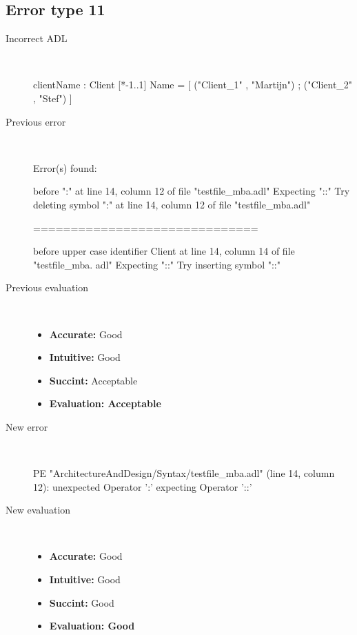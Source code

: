 \subsection{Error type 11}
  \begin{description}
  \item[Incorrect ADL]~\\
\begin{adl}
clientName : Client [*-1..1] Name =
    [ ("Client_1"      , "Martijn")
    ; ("Client_2"      , "Stef")
    ]\end{adl}
  \item[Previous error]~\\
\begin{haskell}
Error(s) found:

before ":" at line 14, column 12 of file "testfile_mba.adl"
Expecting "::"
Try deleting symbol ":" at line 14, column 12 of file "testfile_mba.adl"

==============================

before upper case identifier Client at line 14, column 14 of file "testfile_mba.
adl"
Expecting "::"
Try inserting symbol "::"\end{haskell}
  \item[Previous evaluation]~\\
    \begin{itemize}
    \item \textbf{Accurate:} Good
    \item \textbf{Intuitive:} Good
    \item \textbf{Succint:} Acceptable
    \item \textbf{Evaluation: Acceptable}
    \end{itemize}
  \item[New error]~\\
\begin{haskell}
PE "ArchitectureAndDesign/Syntax/testfile_mba.adl" (line 14, column 12):
unexpected Operator ':'
expecting Operator '::'\end{haskell}
  \item[New evaluation]~\\
    \begin{itemize}
    \item \textbf{Accurate:} Good
    \item \textbf{Intuitive:} Good
    \item \textbf{Succint:} Good
    \item \textbf{Evaluation: Good
}
    \end{itemize}
  \end{description}

